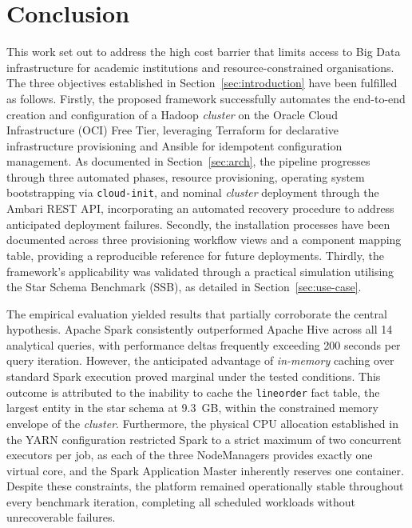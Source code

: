 \section{Conclusion}
\label{sec:conclusion}


This work set out to address the high cost barrier that limits access to Big Data infrastructure 
for academic institutions and resource-constrained organisations. The three objectives established 
in Section~\ref{sec:introduction} have been fulfilled as follows. Firstly, the proposed framework 
successfully automates the end-to-end creation and configuration of a Hadoop \emph{cluster} on the 
Oracle Cloud Infrastructure (OCI) Free Tier, leveraging Terraform for declarative infrastructure 
provisioning and Ansible for idempotent configuration management. As documented in 
Section~\ref{sec:arch}, the pipeline progresses through three automated phases, resource 
provisioning, operating system bootstrapping via \texttt{cloud-init}, and nominal \emph{cluster} 
deployment through the Ambari REST API, incorporating an automated recovery procedure to address 
anticipated deployment failures. Secondly, the installation processes have been 
documented across three provisioning workflow views and a component mapping table, providing a 
reproducible reference for future deployments. Thirdly, the framework's applicability was 
validated through a practical simulation utilising the Star Schema Benchmark (SSB), as detailed in 
Section~\ref{sec:use-case}.

The empirical evaluation yielded results that partially corroborate the central hypothesis. 
Apache Spark consistently outperformed Apache Hive across all 14 analytical queries, 
with performance deltas frequently exceeding 200 seconds per query iteration. However, the 
anticipated advantage of \emph{in-memory} caching over standard Spark execution proved marginal 
under the tested conditions. This outcome is attributed to the inability to cache the 
\texttt{lineorder} fact table, the largest entity in the star schema at 9.3~GB, within the 
constrained memory envelope of the \emph{cluster}. Furthermore, the physical CPU allocation 
established in the YARN configuration restricted Spark to a strict maximum of two concurrent 
executors per job, as each of the three NodeManagers provides exactly one virtual core, and the 
Spark Application Master inherently reserves one container. Despite these constraints, 
the platform remained operationally stable throughout every benchmark iteration, completing all 
scheduled workloads without unrecoverable failures.

